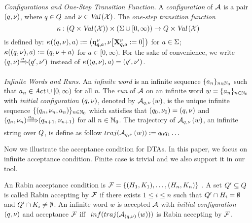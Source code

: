 {\em Configurations and One-Step Transition Function.}
A \emph{configuration} of $\mathcal{A}$ is a pair $(q,\nu)$, where $q\in Q$ and $\nu\in\mbox{\sl Val}\left(\mathcal{X}\right)$.
The \emph{one-step transition function}
\[
\kappa:(Q\times\mbox{\sl Val}\left(\mathcal{X}\right))\times (\Sigma\cup [0,\infty))\rightarrow Q\times\mbox{\sl Val}\left(\mathcal{X}\right)
\]
is defined by: $\kappa((q,\nu),a):=\left(\mathbf{q}_{q,a}^{\nu},{\nu}{\left[\mathbf{X}_{q,a}^{\nu}:=0\right]}\right)$ for $a\in\Sigma$; $\kappa((q,\nu),a):=(q,\nu+a)$ for $a\in [0,\infty)$.
For the sake of convenience, we write ${(q,\nu)}{\xRightarrow{a}}{(q',\nu')}$
instead of $\kappa((q,\nu),a)=(q',\nu')$.

{\em Infinite Words and Runs.}
An \emph{infinite word} is an infinite sequence $\{a_n\}_{n\in\mathbb{N}_0}$ such that $a_n\in \mbox{\sl Act}\cup [0,\infty)$ for all $n$.
%
%
The \emph{run} of $\mathcal{A}$ on an infinite word $w=\{a_n\}_{n\in\mathbb{N}_0}$
with \emph{initial configuration} $(q,\nu)$, denoted by ${\mathcal{A}}_{q,\nu}\left(w\right)$, is the unique infinite
sequence $\{\left(q_n,\nu_n,a_n\right)\}_{n\in\mathbb{N}_0}$
which satisfies that $(q_0,\nu_0)=(q,\nu)$ and ${(q_n,\nu_n)}{\xRightarrow{a_n}}{(q_{n+1},\nu_{n+1})}$
for all $n\in\mathbb{N}_0$.
The trajectory of ${\mathcal{A}}_{q,\nu}\left(w\right)$, an infinite string over $Q$,
is define as follow $traj (  {\mathcal{A}}_{q,\nu}\left(w\right)  ) := q_0 q_1 \dots$

Now we illustrate the acceptance condition for DTAs. In this paper, we focus on infinite acceptance condition. Finite case is trivial and we also support it in our tool.

\vspace{-0.8em}
\begin{definition}
An Rabin acceptance condition is 
$
    \mathcal{F} 
        = \left\{ 
            (H_1,K_1 ), 
            \dots ,
            (H_n,K_n) 
        \right\} 
$ .
A set $Q' \subseteq Q $ is called Rabin accepting by $\mathcal{F}$ 
if there exists $ 1 \leq i \leq n$ such that $ Q' \cap H_i= \emptyset $ 
and $ Q' \cap K_i \neq \emptyset $. An infinite word $w$ is accepted  
$\mathcal{A}$ with \emph{initial configuration} $(q,\nu)$ and acceptance $\mathcal{F}$ iff    
$
    \mbox{  }
    inf (  
        traj (  
            {\mathcal{A}}_{(q,\nu)}\left(w\right) 
         )
     )
$ is Rabin accepting by $\mathcal{F}$.
\end{definition}

